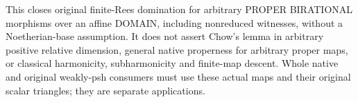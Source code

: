 \begin{remark}
This closes original finite-Rees domination for arbitrary PROPER BIRATIONAL
morphisms over an affine DOMAIN, including nonreduced witnesses, without a
Noetherian-base assumption.  It does not assert Chow's lemma in arbitrary
positive relative dimension, general native properness for arbitrary proper
maps, or classical harmonicity, subharmonicity and finite-map descent.
Whole native and original weakly-psh consumers must use these actual maps
and their original scalar triangles; they are separate applications.
\end{remark}

